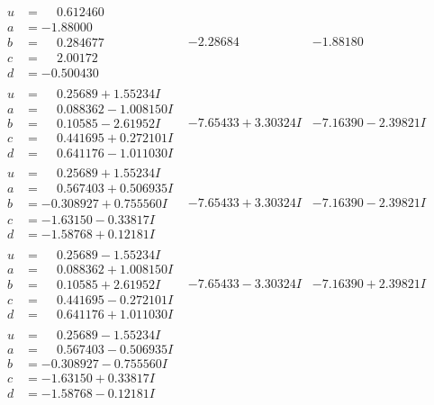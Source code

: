 \documentclass[1p]{elsarticle_modified}
\theoremstyle{definition}
\begin{document}
$$\begin{array}{c|c|c}
\begin{aligned}
u &= \phantom{-}0.612460\phantom{ +0.000000I} \\
a &= -1.88000\phantom{ +0.000000I} \\
b &= \phantom{-}0.284677\phantom{ +0.000000I} \\
c &= \phantom{-}2.00172\phantom{ +0.000000I} \\
d &= -0.500430\phantom{ +0.000000I}\end{aligned}
 & -2.28684\phantom{ +0.000000I} & -1.88180\phantom{ +0.000000I} \\ \hline\begin{aligned}
u &= \phantom{-}0.25689 + 1.55234 I \\
a &= \phantom{-}0.088362 - 1.008150 I \\
b &= \phantom{-}0.10585 - 2.61952 I \\
c &= \phantom{-}0.441695 + 0.272101 I \\
d &= \phantom{-}0.641176 - 1.011030 I\end{aligned}
 & -7.65433 + 3.30324 I & -7.16390 - 2.39821 I \\ \hline\begin{aligned}
u &= \phantom{-}0.25689 + 1.55234 I \\
a &= \phantom{-}0.567403 + 0.506935 I \\
b &= -0.308927 + 0.755560 I \\
c &= -1.63150 - 0.33817 I \\
d &= -1.58768 + 0.12181 I\end{aligned}
 & -7.65433 + 3.30324 I & -7.16390 - 2.39821 I \\ \hline\begin{aligned}
u &= \phantom{-}0.25689 - 1.55234 I \\
a &= \phantom{-}0.088362 + 1.008150 I \\
b &= \phantom{-}0.10585 + 2.61952 I \\
c &= \phantom{-}0.441695 - 0.272101 I \\
d &= \phantom{-}0.641176 + 1.011030 I\end{aligned}
 & -7.65433 - 3.30324 I & -7.16390 + 2.39821 I \\ \hline\begin{aligned}
u &= \phantom{-}0.25689 - 1.55234 I \\
a &= \phantom{-}0.567403 - 0.506935 I \\
b &= -0.308927 - 0.755560 I \\
c &= -1.63150 + 0.33817 I \\
d &= -1.58768 - 0.12181 I\end{aligned}

\end{array}$$
\end{document}

